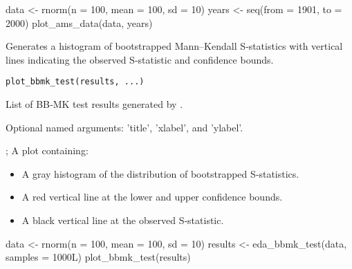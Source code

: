 \documentclass[a4paper]{book}
\begin{document}
%
\begin{Examples}
\begin{ExampleCode}
data <- rnorm(n = 100, mean = 100, sd = 10)
years <- seq(from = 1901, to = 2000)
plot_ams_data(data, years)

\end{ExampleCode}
\end{Examples}
%
\begin{Description}
Generates a histogram of bootstrapped Mann–Kendall S‐statistics with vertical
lines indicating the observed S‐statistic and confidence bounds.
\end{Description}
%
\begin{Usage}
\begin{verbatim}
plot_bbmk_test(results, ...)
\end{verbatim}
\end{Usage}
%
\begin{Arguments}
\begin{ldescription}
\item[\code{results}] List of BB‐MK test results generated by .

\item[\code{...}] Optional named arguments: 'title', 'xlabel', and 'ylabel'.
\end{ldescription}
\end{Arguments}
%
\begin{Value}
; A plot containing:
\begin{itemize}

\item{} A gray histogram of the distribution of bootstrapped S‐statistics.
\item{} A red vertical line at the lower and upper confidence bounds.
\item{} A black vertical line at the observed S‐statistic.

\end{itemize}

\end{Value}
%
\begin{Examples}
\begin{ExampleCode}
data <- rnorm(n = 100, mean = 100, sd = 10)
results <- eda_bbmk_test(data, samples = 1000L)
plot_bbmk_test(results)

\end{ExampleCode}
\end{Examples}
\end{document}
